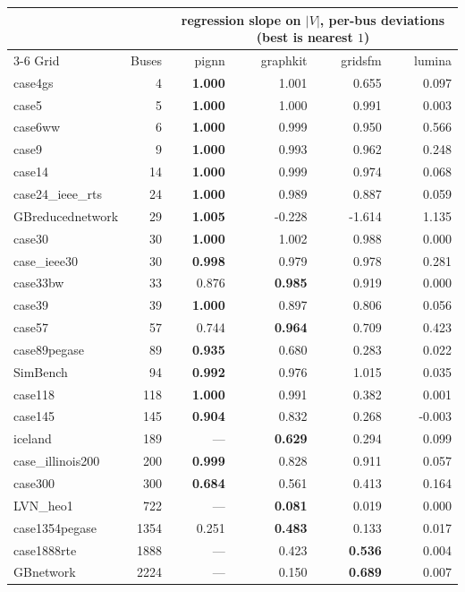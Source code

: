 \documentclass[10pt]{article}
\begin{document}
\begin{longtable}{lrrrrr}
\toprule
& & \multicolumn{4}{c}{regression slope on $|V|$, per-bus deviations (best is nearest $1$)} \\
\cmidrule(lr){3-6}
Grid & Buses & pignn & graphkit & gridsfm & lumina \\
\midrule
\endhead
case4gs & 4 & \textbf{1.000} & 1.001 & 0.655 & 0.097 \\
case5 & 5 & \textbf{1.000} & 1.000 & 0.991 & 0.003 \\
case6ww & 6 & \textbf{1.000} & 0.999 & 0.950 & 0.566 \\
case9 & 9 & \textbf{1.000} & 0.993 & 0.962 & 0.248 \\
case14 & 14 & \textbf{1.000} & 0.999 & 0.974 & 0.068 \\
case24\_ieee\_rts & 24 & \textbf{1.000} & 0.989 & 0.887 & 0.059 \\
GBreducednetwork & 29 & \textbf{1.005} & -0.228 & -1.614 & 1.135 \\
case30 & 30 & \textbf{1.000} & 1.002 & 0.988 & 0.000 \\
case\_ieee30 & 30 & \textbf{0.998} & 0.979 & 0.978 & 0.281 \\
case33bw & 33 & 0.876 & \textbf{0.985} & 0.919 & 0.000 \\
case39 & 39 & \textbf{1.000} & 0.897 & 0.806 & 0.056 \\
case57 & 57 & 0.744 & \textbf{0.964} & 0.709 & 0.423 \\
case89pegase & 89 & \textbf{0.935} & 0.680 & 0.283 & 0.022 \\
SimBench & 94 & \textbf{0.992} & 0.976 & 1.015 & 0.035 \\
case118 & 118 & \textbf{1.000} & 0.991 & 0.382 & 0.001 \\
case145 & 145 & \textbf{0.904} & 0.832 & 0.268 & -0.003 \\
iceland & 189 & --- & \textbf{0.629} & 0.294 & 0.099 \\
case\_illinois200 & 200 & \textbf{0.999} & 0.828 & 0.911 & 0.057 \\
case300 & 300 & \textbf{0.684} & 0.561 & 0.413 & 0.164 \\
LVN\_heo1 & 722 & --- & \textbf{0.081} & 0.019 & 0.000 \\
case1354pegase & 1354 & 0.251 & \textbf{0.483} & 0.133 & 0.017 \\
case1888rte & 1888 & --- & 0.423 & \textbf{0.536} & 0.004 \\
GBnetwork & 2224 & --- & 0.150 & \textbf{0.689} & 0.007 \\

\end{longtable}
\end{document}
